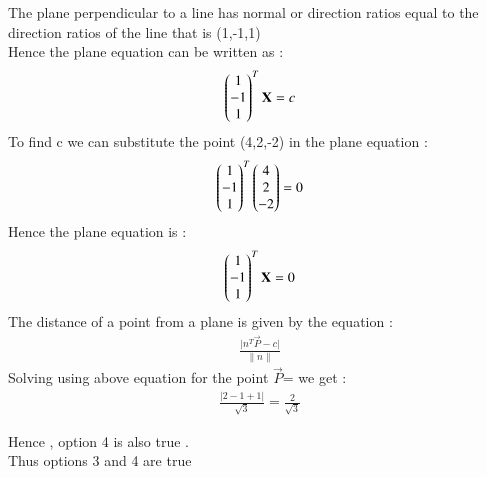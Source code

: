 \documentclass[journal]{IEEEtran}
\begin{document}
The plane perpendicular to a line has normal or direction ratios equal to the direction ratios of the line that is (1,-1,1)\\
Hence the plane equation can be written as :
\begin{align}
    \begin{pmatrix}1\\-1\\1\end{pmatrix}^T\mathbf{X} = c
\end{align}
To find c we can substitute the point (4,2,-2) in the plane equation :
\begin{align}
    \begin{pmatrix}1\\-1\\1\end{pmatrix}^T\begin{pmatrix}4\\2\\-2\end{pmatrix} = 0
\end{align}
Hence the plane equation is :
\begin{align}
    \begin{pmatrix}1\\-1\\1\end{pmatrix}^T\mathbf{X} = 0
\end{align}
The distance of a point from a plane is given by the equation :
\begin{align}
    \frac{\lvert n^{T}\vec{P} - c \rvert}{\lVert n \rVert}
\end{align}
Solving using above equation for the point $\vec{P} $=  we get :
 \begin{align}
      \frac{\lvert 2 - 1 +1 \rvert}{\sqrt{3}} = \frac{2}{\sqrt{3}}
 \end{align}

 Hence , option 4 is also true .\\
 Thus options 3 and 4 are true 
\end{document}
